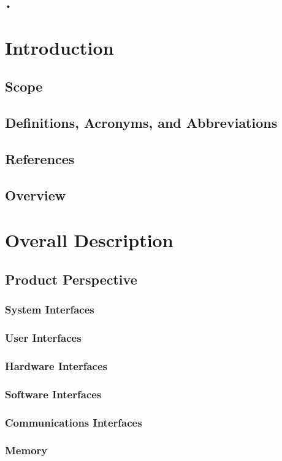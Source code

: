 \documentclass[12pt,a4paper,landscape]{report}
\begin{document}


•\section{Introduction}
	\subsection{Scope}
	\subsection{Definitions, Acronyms, and Abbreviations}
	\subsection{References}
	\subsection{Overview}

\section{Overall Description}
	\subsection{Product Perspective}
		\subsubsection{System Interfaces}
		\subsubsection{User Interfaces}
		\subsubsection{Hardware Interfaces}
		\subsubsection{Software Interfaces}
		\subsubsection{Communications Interfaces}
		\subsubsection{Memory}
\end{document}

